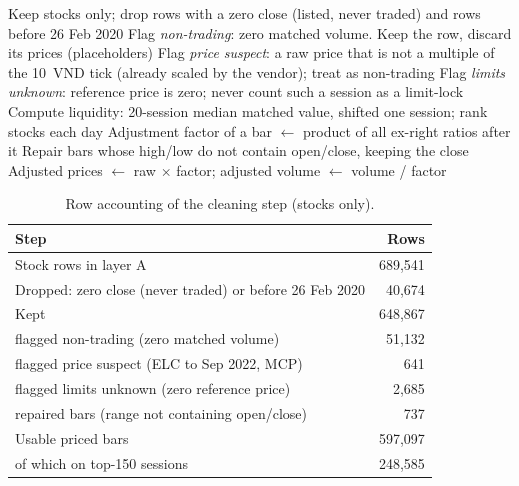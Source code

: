 \begin{algorithm}[ht]
  \caption{Cleaning of layer A}
  \label{alg:clean}
  Keep stocks only; drop rows with a zero close (listed, never traded) and rows before 26 Feb 2020\;
  Flag \emph{non-trading}: zero matched volume. Keep the row, discard its prices (placeholders)\;
  Flag \emph{price suspect}: a raw price that is not a multiple of the 10~VND tick (already scaled by the vendor); treat as non-trading\;
  Flag \emph{limits unknown}: reference price is zero; never count such a session as a limit-lock\;
  Compute liquidity: 20-session median matched value, shifted one session; rank stocks each day\;
  Adjustment factor of a bar $\leftarrow$ product of all ex-right ratios after it\;
  Repair bars whose high/low do not contain open/close, keeping the close\;
  Adjusted prices $\leftarrow$ raw $\times$ factor; adjusted volume $\leftarrow$ volume / factor\;
\end{algorithm}

\begin{table}[ht]
  \centering
  \caption{Row accounting of the cleaning step (stocks only).}
  \label{tab:data-rows}
  \begin{tabular}{lr}
    \toprule
    Step & Rows \\
    \midrule
    Stock rows in layer A                                       & 689{,}541 \\
    Dropped: zero close (never traded) or before 26 Feb 2020    & 40{,}674 \\
    Kept                                                        & 648{,}867 \\
    \quad flagged non-trading (zero matched volume)             & 51{,}132 \\
    \quad flagged price suspect (ELC to Sep 2022, MCP)          & 641 \\
    \quad flagged limits unknown (zero reference price)         & 2{,}685 \\
    \quad repaired bars (range not containing open/close)       & 737 \\
    Usable priced bars                                          & 597{,}097 \\
    \quad of which on top-150 sessions                          & 248{,}585 \\
    \bottomrule
  \end{tabular}
\end{table}

